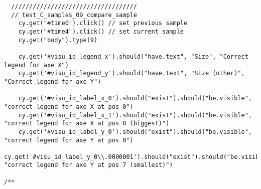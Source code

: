 \begin{verbatim}
  ///////////////////////////////////
  // test_C_samples_09_compare_sample
    cy.get("#time0").click() // set previous sample
    cy.get("#time4").click() // set current sample
    cy.get("body").type(9)

    cy.get('#visu_id_legend_x').should("have.text", "Size", "Correct legend for axe X")
    cy.get('#visu_id_legend_y').should("have.text", "Size (other)", "Correct legend for axe Y")

    cy.get('#visu_id_label_x_0').should("exist").should("be.visible", "correct legend for axe X at pos 0")
    cy.get('#visu_id_label_x_1').should("exist").should("be.visible", "correct legend for axe X at pos 8 (biggest)")
    cy.get('#visu_id_label_y_0').should("exist").should("be.visible", "correct legend for axe Y at pos 0")
    cy.get('#visu_id_label_y_0\\.0000001').should("exist").should("be.visible", "correct legend for axe Y at pos 7 (smallest)")

/**
\end{verbatim}


